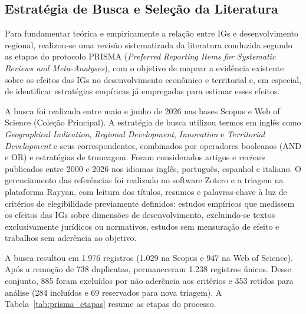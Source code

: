 \documentclass[12pt, a4paper]{article}
\begin{document}
\subsection{Estratégia de Busca e Seleção da Literatura}
\label{sec:prisma}

Para fundamentar teórica e empiricamente a relação entre IGs e desenvolvimento regional, realizou-se uma revisão sistematizada da literatura conduzida segundo as etapas do protocolo PRISMA (\textit{Preferred Reporting Items for Systematic Reviews and Meta-Analyses}), com o objetivo de mapear a evidência existente sobre os efeitos das IGs no desenvolvimento econômico e territorial e, em especial, de identificar estratégias empíricas já empregadas para estimar esses efeitos.

A busca foi realizada entre maio e junho de 2026 nas bases Scopus e Web of Science (Coleção Principal). A estratégia de busca utilizou termos em inglês como \textit{Geographical Indication}, \textit{Regional Development}, \textit{Innovation} e \textit{Territorial Development} e seus correspondentes, combinados por operadores booleanos (AND e OR) e estratégias de truncagem. Foram considerados artigos e \textit{reviews} publicados entre 2000 e 2026 nos idiomas inglês, português, espanhol e italiano. O gerenciamento das referências foi realizado no software Zotero e a triagem na plataforma Rayyan, com leitura dos títulos, resumos e palavras-chave à luz de critérios de elegibilidade previamente definidos: estudos empíricos que medissem os efeitos das IGs sobre dimensões de desenvolvimento, excluindo-se textos exclusivamente jurídicos ou normativos, estudos sem mensuração de efeito e trabalhos sem aderência ao objetivo.

A busca resultou em 1.976 registros (1.029 na Scopus e 947 na Web of Science). Após a remoção de 738 duplicatas, permaneceram 1.238 registros únicos. Desse conjunto, 885 foram excluídos por não aderência aos critérios e 353 retidos para análise (284 incluídos e 69 reservados para nova triagem). A Tabela~\ref{tab:prisma_etapas} resume as etapas do processo.
\end{document}
